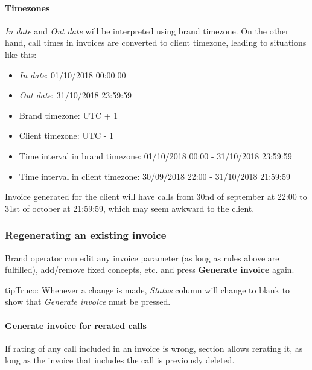 \documentclass[letterpaper,10pt,spanish]{sphinxmanual}
\begin{document}
\paragraph{Timezones}
\label{administration_portal/brand/invoicing/invoices:timezones}
\emph{In date} and \emph{Out date} will be interpreted using brand timezone. On the other hand, call times in invoices are converted
to client timezone, leading to situations like this:
\begin{itemize}
\item {} 
\emph{In date}: 01/10/2018 00:00:00

\item {} 
\emph{Out date}: 31/10/2018 23:59:59

\item {} 
Brand timezone: UTC + 1

\item {} 
Client timezone: UTC - 1

\item {} 
Time interval in brand timezone: 01/10/2018 00:00 - 31/10/2018 23:59:59

\item {} 
Time interval in client timezone: 30/09/2018 22:00 - 31/10/2018 21:59:59

\end{itemize}

Invoice generated for the client will have calls from 30nd of september at 22:00 to 31st of october at 21:59:59, which
may seem awkward to the client.


\subsubsection{Regenerating an existing invoice}
\label{administration_portal/brand/invoicing/invoices:regenerating-an-existing-invoice}
Brand operator can edit any invoice parameter (as long as rules above are fulfilled), add/remove fixed concepts, etc. and
press \textbf{Generate invoice} again.

\begin{notice}{tip}{Truco:}
Whenever a change is made, \emph{Status} column will change to blank to show that \emph{Generate invoice} must be pressed.
\end{notice}


\paragraph{Generate invoice for rerated calls}
\label{administration_portal/brand/invoicing/invoices:generate-invoice-for-rerated-calls}
If rating of any call included in an invoice is wrong, {\hyperref[administration_portal/platform/external_calls:external\string-calls]{}} section allows rerating it, as long as the
invoice that includes the call is previously deleted.
\end{document}
